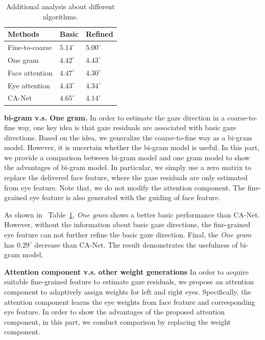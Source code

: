 \documentclass[letterpaper]{article} %
\def\bm #1{\boldsymbol{#1}}%
\newcommand{\Tref}[1]{Table~\ref{#1}}
\begin{document}
\begin{table}[t]
	\renewcommand\arraystretch{1.3}
	\normalsize
	\caption{Additional analysis about different algorithms.}
	\begin{center}
		
		\begin{tabular}{|p{3.0cm}<{\centering}|p{1.9cm}<{\centering}|p{1.9cm}<{\centering}|}
			\hline
			
			Methods& Basic& 	Refined \\
			\hline
			Fine-to-coarse			&$5.14^{\circ}$		&$5.00^{\circ}$		\\
			
			One gram				&$4.42^{\circ}$ 	&$4.43^{\circ}$	 \\
			
			Face attention				&$4.47^{\circ}$		&$4.30^{\circ}$				\\
			
			Eye attention				&$4.43^{\circ}$		&$4.34^{\circ}$			\\
			\hline
			CA-Net					&$\bm{4.65^{\circ}}$		&$\bm{4.14^{\circ}}$			\\
			\hline
		\end{tabular}
		\label{table:attention}
	\end{center}
\end{table}
\textbf{bi-gram v.s. One gram.}
In order to estimate the gaze direction in a coarse-to-fine way, one key idea is that gaze residuals are associated with basic gaze directions.
Based on the idea, we generalize the coarse-to-fine way as a bi-gram model.
However, it is uncertain whether the bi-gram model is useful.
In this part, we provide a comparison between bi-gram model and one gram model to show the advantages of bi-gram model. 
In particular, we simply use a zero matrix to replace the delivered face feature, where the gaze residuals are only estimated from eye feature.
Note that, we do not modify the attention component. The fine-grained eye feature is also generated with the guiding of face feature.

As shown in ~\Tref{table:attention}, \emph{One gram} shows a better basic performance than CA-Net.
However, without the information about basic gaze directions, the fine-grained eye feature can not further refine the basic gaze direction.  
Final, the \emph{One gram} has $0.29^{\circ}$ decrease than CA-Net.
The result demonstrates the usefulness of bi-gram model.

\textbf{Attention component v.s. other weight generations}
In order to acquire suitable fine-grained feature to estimate gaze residuals,
we propose an attention component to adaptively assign weights for left and right eyes.
Specifically, the attention component learns the eye weights from face feature and corresponding eye feature.
In order to show the advantages of the proposed attention component, in this part, we conduct comparison by replacing the weight component.  
\end{document}

